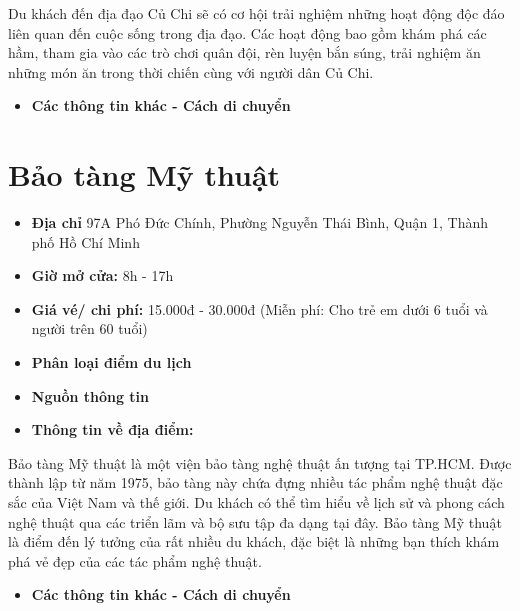 \documentclass{article}
\begin{document}
Du khách đến địa đạo Củ Chi sẽ có cơ hội trải nghiệm những hoạt động độc đáo liên quan đến cuộc sống trong địa đạo. Các hoạt động bao gồm khám phá các hầm, tham gia vào các trò chơi quân đội, rèn luyện bắn súng, trải nghiệm ăn những món ăn trong thời chiến cùng với người dân Củ Chi.

\begin{itemize}
    \item{\textbf{Các thông tin khác - Cách di chuyển}}
\end{itemize}

\section{Bảo tàng Mỹ thuật}
\begin{itemize}
    \item{\textbf{Địa chỉ}} 97A Phó Đức Chính, Phường Nguyễn Thái Bình, Quận 1, Thành phố Hồ Chí Minh
    \item{\textbf{Giờ mở cửa:}} 8h - 17h
    \item{\textbf{Giá vé/ chi phí:}} 15.000đ - 30.000đ (Miễn phí: Cho trẻ em dưới 6 tuổi và người trên 60 tuổi)
    \item{\textbf{Phân loại điểm du lịch} }
    \item{\textbf{Nguồn thông tin}}
    \item{\textbf{Thông tin về địa điểm:}}
\end{itemize}
Bảo tàng Mỹ thuật là một viện bảo tàng nghệ thuật ấn tượng tại TP.HCM. Được thành lập từ năm 1975, bảo tàng này chứa đựng nhiều tác phẩm nghệ thuật đặc sắc của Việt Nam và thế giới. Du khách có thể tìm hiểu về lịch sử và phong cách nghệ thuật qua các triển lãm và bộ sưu tập đa dạng tại đây. Bảo tàng Mỹ thuật là điểm đến lý tưởng của rất nhiều du khách, đặc biệt là những bạn thích khám phá vẻ đẹp của các tác phẩm nghệ thuật.

\begin{itemize}
    \item{\textbf{Các thông tin khác - Cách di chuyển}}
\end{itemize}
\end{document}
